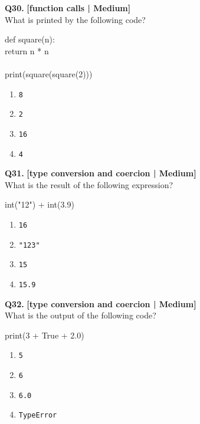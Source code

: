 \noindent\textbf{Q30.} \hfill {\small\color{LPUOrange}\textbf{[function calls | Medium]}}\\[2pt]
What is printed by the following code? 

\begin{pycode}
def square(n):\\
return n * n\\
~\\
print(square(square(2)))
\end{pycode}

\begin{enumerate}[label=(\alph*),topsep=2pt,itemsep=1pt,partopsep=0pt,parsep=0pt]
    \item \relax \texttt{8}
    \item \relax \texttt{2}
    \item \relax \texttt{16}
    \item \relax \texttt{4}
\end{enumerate}
\vspace{2mm}

\noindent\textbf{Q31.} \hfill {\small\color{LPUOrange}\textbf{[type conversion and coercion | Medium]}}\\[2pt]
What is the result of the following expression? 

\begin{pycode}
int("12") + int(3.9)
\end{pycode}

\begin{enumerate}[label=(\alph*),topsep=2pt,itemsep=1pt,partopsep=0pt,parsep=0pt]
    \item \relax \texttt{16}
    \item \relax \texttt{"123"}
    \item \relax \texttt{15}
    \item \relax \texttt{15.9}
\end{enumerate}
\vspace{2mm}

\noindent\textbf{Q32.} \hfill {\small\color{LPUOrange}\textbf{[type conversion and coercion | Medium]}}\\[2pt]
What is the output of the following code? 

\begin{pycode}
print(3 + True + 2.0)
\end{pycode}

\begin{enumerate}[label=(\alph*),topsep=2pt,itemsep=1pt,partopsep=0pt,parsep=0pt]
    \item \relax \texttt{5}
    \item \relax \texttt{6}
    \item \relax \texttt{6.0}
    \item \relax \texttt{TypeError}
\end{enumerate}
\vspace{2mm}

